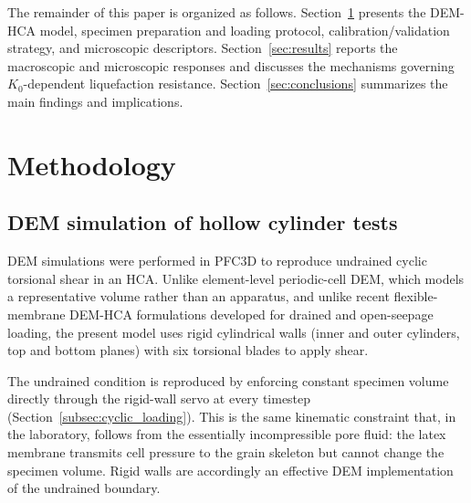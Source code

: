 \documentclass[a4paper,fleqn]{cas-sc}
\newcommand{\Kzero}{\ensuremath{K_0}}
\begin{document}
The remainder of this paper is organized as follows. Section~\ref{sec:methodology} presents the DEM-HCA model, specimen preparation and loading protocol, calibration/validation strategy, and microscopic descriptors. Section~\ref{sec:results} reports the macroscopic and microscopic responses and discusses the mechanisms governing \Kzero{}-dependent liquefaction resistance. Section~\ref{sec:conclusions} summarizes the main findings and implications.

\section{Methodology}
\label{sec:methodology}

\subsection{DEM simulation of hollow cylinder tests}
\label{subsec:dem_hca}

DEM simulations were performed in \textsc{PFC3D} \citep{Itasca2021} to reproduce undrained cyclic torsional shear in an HCA. Unlike element-level periodic-cell DEM, which models a representative volume rather than an apparatus, and unlike recent flexible-membrane DEM-HCA formulations \citep{Song2024,Song2024suffusion} developed for drained and open-seepage loading, the present model uses rigid cylindrical walls (inner and outer cylinders, top and bottom planes) with six torsional blades to apply shear.

The undrained condition is reproduced by enforcing constant specimen volume directly through the rigid-wall servo at every timestep (Section~\ref{subsec:cyclic_loading}). This is the same kinematic constraint that, in the laboratory, follows from the essentially incompressible pore fluid: the latex membrane transmits cell pressure to the grain skeleton but cannot change the specimen volume. Rigid walls are accordingly an effective DEM implementation of the undrained boundary.
\end{document}
